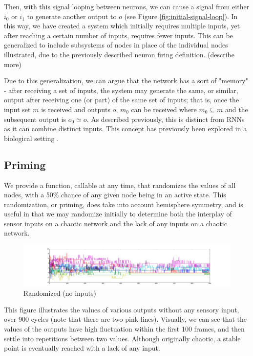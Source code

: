 \documentclass[12pt]{article}
\begin{document}
Then, with this signal looping between neurons, we can cause a signal from either $i_0$ or $i_1$ to generate another output to $o$ (see Figure \ref{fig:initial-signal-loop}).  In this way, we have created a system which initially requires multiple inputs, yet after reaching a certain number of inputs, requires fewer inputs.  This can be generalized to include subsystems of nodes in place of the individual nodes illustrated, due to the previously described neuron firing definition. (describe more)

Due to this generalization, we can argue that the network has a sort of "memory" - after receiving a set of inputs, the system may generate the same, or similar, output after receiving one (or part) of the same set of inputs; that is, once the input set $m$ is received and outputs $o$, $m_0$ can be received where $m_0 \subseteq m$ and the subsequent output is $o_0 \simeq o$.  As described previously, this is distinct from RNNs as it can combine distinct inputs.  This concept has previously been explored in a biological setting \cite{synapsememory}.

\subsection{Priming} \label{priming}

We provide a function, callable at any time, that randomizes the values of all nodes, with a 50\% chance of any given node being in an active state.  This randomization, or priming, does take into account hemisphere symmetry, and is useful in that we may randomize initially to determine both the interplay of sensor inputs on a chaotic network and the lack of any inputs on a chaotic network.

\begin{figure}[H]
    \includegraphics[width=\linewidth]{../visualizations/8knodes_stable_line.png}
    \caption{Randomized (no inputs)}
\end{figure}

This figure illustrates the values of various outputs without any sensory input, over 900 cycles (note that there are two pink lines).  Visually, we can see that the values of the outputs have high fluctuation within the first 100 frames, and then settle into repetitions  between two values.  Although originally chaotic, a stable point is eventually reached with a lack of any input.
\end{document}
